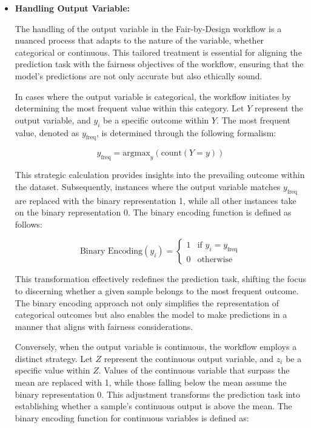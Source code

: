\begin{itemize}
    \item \textbf{Handling Output Variable:} 
    
    The handling of the output variable in the Fair-by-Design workflow is a nuanced process that adapts to the nature of the variable, whether categorical or continuous. This tailored treatment is essential for aligning the prediction task with the fairness objectives of the workflow, ensuring that the model's predictions are not only accurate but also ethically sound.


    In cases where the output variable is categorical, the workflow initiates by determining the most frequent value within this category. Let $Y$ represent the output variable, and $y_i$ be a specific outcome within $Y$. The most frequent value, denoted as $y_{\text{freq}}$, is determined through the following formalism:

    \[
    y_{\text{freq}} = \text{argmax}_y \left( \text{count}(Y = y) \right)
    \]

    This strategic calculation provides insights into the prevailing outcome within the dataset. Subsequently, instances where the output variable matches $y_{\text{freq}}$ are replaced with the binary representation 1, while all other instances take on the binary representation 0. The binary encoding function is defined as follows:

    \[
    \text{Binary Encoding}(y_i) = \begin{cases} 
    1 & \text{if } y_i = y_{\text{freq}} \\ 
    0 & \text{otherwise}
    \end{cases}
    \]

    This transformation effectively redefines the prediction task, shifting the focus to discerning whether a given sample belongs to the most frequent outcome. The binary encoding approach not only simplifies the representation of categorical outcomes but also enables the model to make predictions in a manner that aligns with fairness considerations.


    Conversely, when the output variable is continuous, the workflow employs a distinct strategy. Let $Z$ represent the continuous output variable, and $z_i$ be a specific value within $Z$. Values of the continuous variable that surpass the mean are replaced with 1, while those falling below the mean assume the binary representation 0. This adjustment transforms the prediction task into establishing whether a sample's continuous output is above the mean. The binary encoding function for continuous variables is defined as:


\end{itemize}
